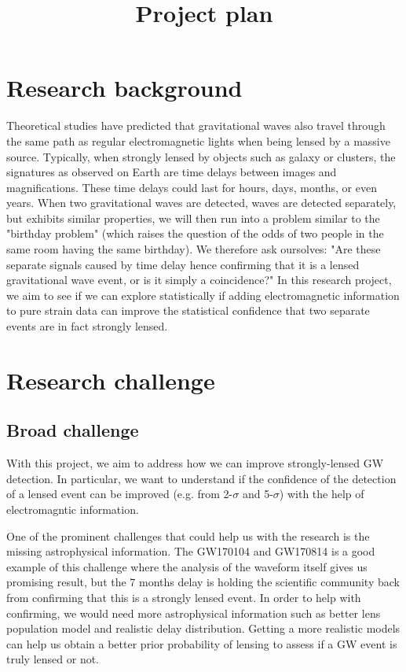 \documentclass[pdflatex,sn-mathphys-num]{sn-jnl}%
\theoremstyle{thmstyleone}%
\theoremstyle{thmstyletwo}%
\theoremstyle{thmstylethree}%
\begin{document}
\title[Article Title]{Project plan}

\author{ }

\maketitle


\section{Research background}

Theoretical studies have predicted that gravitational waves also travel through the same path as regular electromagnetic lights when being lensed by a massive source. 
Typically, when strongly lensed by objects such as galaxy or clusters, the signatures as observed on Earth are time delays between images and magnifications. 
These time delays could last for hours, days, months, or even years. 
When two gravitational waves are detected, waves are detected separately, but exhibits similar properties, we will then run into a problem similar to the "birthday problem" (which raises the question of the odds of two people in the same room having the same birthday). 
We therefore ask oursolves: "Are these separate signals caused by time delay hence confirming that it is a lensed gravitational wave event, or is it simply a coincidence?" In this research project, we aim to see if we can explore statistically if adding electromagnetic information to pure strain data can improve the statistical confidence that two separate events are in fact strongly lensed. 


\section{Research challenge}

\subsection{Broad challenge}

With this project, we aim to address how we can improve strongly-lensed GW detection. 
In particular, we want to understand if the confidence of the detection of a lensed event can be improved (e.g. from 2-$\sigma$ and 5-$\sigma$) with the help of electromagntic information.

One of the prominent challenges that could help us with the research is the missing astrophysical information. 
The GW170104 and GW170814 is a good example of this challenge where the analysis of the waveform itself gives us promising result, but the 7 months delay is holding the scientific community back from confirming that this is a strongly lensed event. 
In order to help with confirming, we would need more astrophysical information such as better lens population model and realistic delay distribution. 
Getting a more realistic models can help us obtain a better prior probability of lensing to assess if a GW event is truly lensed or not.
\end{document}
